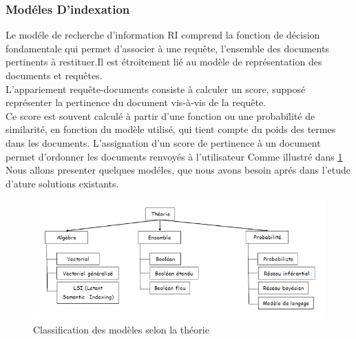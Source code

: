 \documentclass[12pt]{report}
\begin{document}
\subsubsection{Modéles D'indexation}
Le modéle de recherche d'information RI comprend la fonction de décision fondamentale qui permet
d’associer à une requête, l’ensemble des documents pertinents
à restituer.Il est étroitement lié au modèle de représentation des
documents et requêtes.\\
L’appariement requête-documents consiste à calculer un score,
supposé représenter la pertinence du document vis-à-vis de la
requête.\\
Ce score est souvent calculé à partir d’une fonction ou une
probabilité de similarité, en fonction du modèle utilisé, qui tient
compte du poids des termes dans les documents.
L’assignation d’un score de pertinence à un document permet
d’ordonner les documents renvoyés à l’utilisateur
Comme illustré dans \ref{aaa:a2} Nous allons presenter quelques modéles, que nous avons besoin aprés dans l'etude d'ature solutions existants. 
\begin{figure}[h]
    \centering
    \includegraphics[width=1\textwidth]{indexation}
    \caption{Classification des modèles selon la théorie}
    \label{aaa:a2}
\end{figure}
\end{document}
